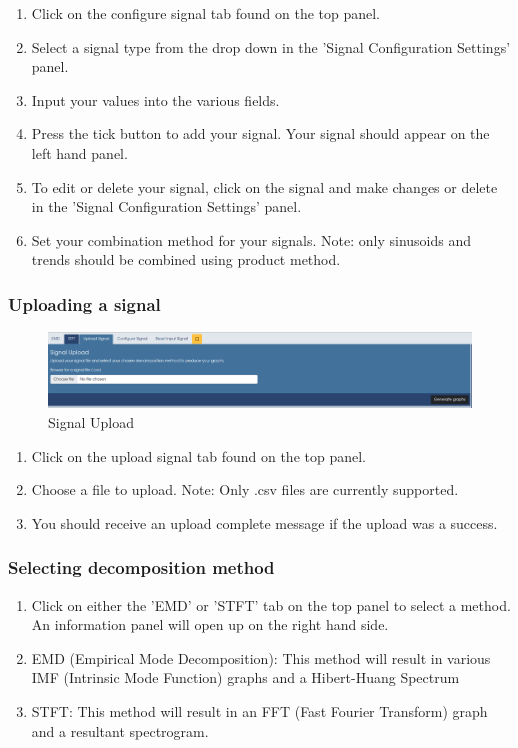 \begin{enumerate}
\item Click on the configure signal tab found on the top panel.
\item Select a signal type from the drop down in the 'Signal Configuration Settings' panel.
\item Input your values into the various fields.
\item Press the tick button to add your signal. Your signal should appear on the left hand panel.
\item To edit or delete your signal, click on the signal and make changes or delete in the 'Signal Configuration Settings' panel.
\item Set your combination method for your signals. Note: only sinusoids and trends should be combined using product method.
\end{enumerate}

\subsubsection{Uploading a signal}
\begin{figure}
\centering
\includegraphics[width=1.0\textwidth]{figures/signalupload.png}
\caption{\label{fig:Signal Upload}Signal Upload}
\end{figure}

\begin{enumerate}
\item Click on the upload signal tab found on the top panel.
\item Choose a file to upload. Note: Only .csv files are currently supported.
\item You should receive an upload complete message if the upload was a success.
\end{enumerate}

\subsubsection{Selecting decomposition method}
\begin{enumerate}
\item Click on either the 'EMD' or 'STFT' tab on the top panel to select a method. An information panel will open up on the right hand side.
\item EMD (Empirical Mode Decomposition): This method will result in various IMF (Intrinsic Mode Function) graphs and a Hibert-Huang Spectrum  
\item STFT: This method will result in an FFT (Fast Fourier Transform) graph and a resultant spectrogram.
\end{enumerate}

